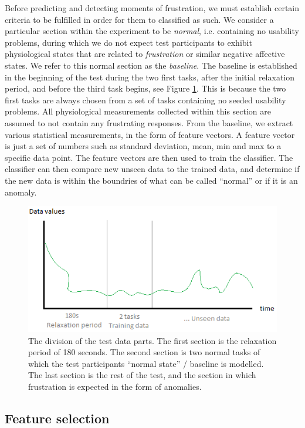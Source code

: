 Before predicting and detecting moments of frustration, we must establish certain criteria to be fulfilled in order for
them to classified as such.  We consider a particular section within the experiment to be \textit{normal},
i.e. containing no usability problems, during which we do not expect test participants to exhibit physiological states
that are related to \textit{frustration} or similar negative affective states. We refer to this normal section as the
\textit{baseline}. The baseline is established in the beginning of the test during the two first tasks, after the
initial relaxation period, and before the third task begins, see Figure \ref{[FIGURE] Data Sections}. This is because the two first tasks are always chosen from
a set of tasks containing no seeded usability problems. All physiological measurements collected within this section are assumed to not contain any frustrating responses. From the baseline, we extract various statistical measurements, in the form of
feature vectors. A feature vector is just a set of numbers such as standard deviation, mean, min and max to a specific data point. 
The feature vectors are then used to train the classifier. The classifier can then compare new unseen data to the trained data, and determine if the new data is within the boundries of what can be called ``normal'' or if it is an anomaly.  
\begin{figure}
    \centering
  \includegraphics[width=0.95\columnwidth]{graphics/rest_period_training_data.png}
    \caption{The division of the test data parts. The first section is the relaxation period of 180 seconds. The second section is two normal tasks of which the test participants ``normal state'' / baseline is modelled. The last section is the rest of the test, and the section in which frustration is expected in the form of anomalies. }
    \label{[FIGURE] Data Sections}
\end{figure}
\subsection{Feature selection}

